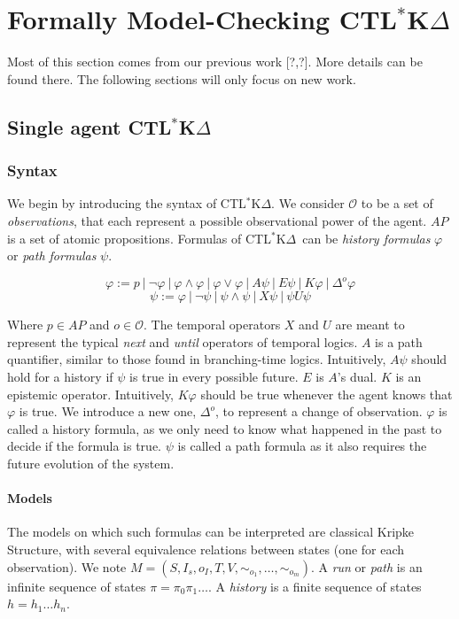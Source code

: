 \documentclass{acmart}
\def\ctlskd{CTL$^{*}$K$\Delta$}
\def\A{\mathit{A}}
\def\E{\mathit{E}}
\def\U{\mathit{U}}
\def\X{\mathit{X}}
\def\K{\mathit{K}}
\def\D#1{\Delta^{#1}}
\def\eqstate#1{\sim_{#1}}
\begin{document}
\section{Formally Model-Checking \ctlskd}
Most of this section comes from our previous work [?,?]. More details can be found there.
The following sections will only focus on new work.

\subsection{Single agent \ctlskd}
\subsubsection{Syntax}

We begin by introducing the syntax of \ctlskd. 
We consider $\mathcal{O}$ to be a set of \textit{observations}, that each represent a possible observational power of the agent. $\mathit{AP}$ is a set of atomic propositions.
Formulas of \ctlskd\ can be \textit{history formulas} $\varphi$ or \textit{path formulas} $\psi$.

$$\varphi := p ~|~ \neg \varphi ~|~ \varphi\wedge\varphi ~|~ \varphi\vee\varphi ~|~ \A\psi ~|~ \E\psi ~|~ \K\varphi ~|~ \D{o}\varphi$$
$$\psi := \varphi ~|~ \neg\psi ~|~ \psi\wedge\psi ~|~ \X\psi ~|~ \psi\U\psi$$

Where $p\in\mathit{AP}$ and $o\in\mathcal{O}$.
The temporal operators $\X$ and $\U$ are meant to represent the typical \textit{next} and \textit{until} operators of temporal logics.
$\A$ is a path quantifier, similar to those found in branching-time logics. Intuitively, $\A\psi$ should hold for a history if $\psi$ is true in every possible future. $\E$ is $\A$'s dual.
$\K$ is an epistemic operator. Intuitively, $\K\varphi$ should be true whenever the agent knows that $\varphi$ is true. We introduce a new one, $\D{o}$, to represent a change of observation.
$\varphi$ is called a history formula, as we only need to know what happened in the past to decide if the formula is true. $\psi$ is called a path formula as it also requires the future evolution of the system.

\paragraph{Models}
The models on which such formulas can be interpreted are classical Kripke Structure, with several equivalence relations between states (one for each observation). We note $M=(S,I_s,o_I,T,V,\eqstate{o_1},\dots,\eqstate{o_m})$.
A \textit{run} or \textit{path} is an infinite sequence of states $\pi=\pi_0\pi_1\dots$. A \textit{history} is a finite sequence of states $h=h_1\dots h_n$.
\end{document}
